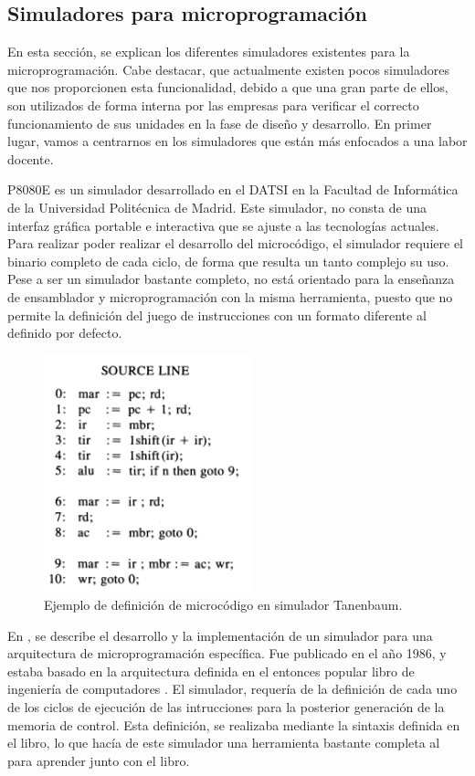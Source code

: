 \subsection{Simuladores para microprogramación}
\label{sec:simuladores_microprogramacion}

En esta sección, se explican los diferentes simuladores existentes para la microprogramación. Cabe destacar, que actualmente existen pocos simuladores que nos proporcionen esta funcionalidad, debido a que una gran parte de ellos, son utilizados de forma interna por las empresas para verificar el correcto funcionamiento de sus unidades en la fase de diseño y desarrollo. En primer lugar, vamos a centrarnos en los simuladores que están más enfocados a una labor docente.

P8080E \cite{p8080E} es un simulador desarrollado en el DATSI en la Facultad de Informática de la Universidad Politécnica de Madrid. Este simulador, no consta de una interfaz gráfica portable e interactiva que se ajuste a las tecnologías actuales. Para realizar poder realizar el desarrollo del microcódigo, el simulador requiere el binario completo de cada ciclo, de forma que resulta un tanto complejo su uso. Pese a ser un simulador bastante completo, no está orientado para la enseñanza de ensamblador y microprogramación con la misma herramienta, puesto que no permite la definición del juego de instrucciones con un formato diferente al definido por defecto.

\begin{figure}[htbp]
 	\centering
 	\includegraphics[width=6cm]{figures/ejemploTanenbaum}
 	\caption{Ejemplo de definición de microcódigo en simulador Tanenbaum.}
	\label{fig:tanenbaum_figure}
\end{figure}

En \cite{yen1986development}, se describe el desarrollo y la implementación de un simulador para una arquitectura de microprogramación específica. Fue publicado en el año 1986, y estaba basado en la arquitectura definida en el entonces popular libro de ingeniería de computadores \cite{tanenbaum1984}. El simulador, requería de la definición de cada uno de los ciclos de ejecución de las intrucciones para la posterior generación de la memoria de control. Esta definición, se realizaba mediante la sintaxis definida en el libro, lo que hacía de este simulador una herramienta bastante completa al para aprender junto con el libro. 


